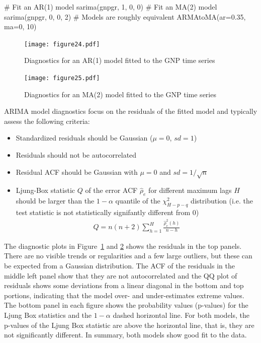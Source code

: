 \begin{samepage}
\begin{Rcode}
# Fit an AR(1) model
sarima(gnpgr, 1, 0, 0)
# Fit an MA(2) model
sarima(gnpgr, 0, 0, 2)
# Models are roughly equivalent
ARMAtoMA(ar=0.35, ma=0, 10)
\end{Rcode}
\end{samepage}

\begin{figure}
\centering
\texttt{[image: figure24.pdf]}
\caption{Diagnostics for an AR(1) model fitted to the GNP time series}
\label{fig:figure24}
\end{figure}

\begin{figure}
\centering
\texttt{[image: figure25.pdf]}
\caption{Diagnostics for an MA(2) model fitted to the GNP time series}
\label{fig:figure25}
\end{figure}

ARIMA model diagnostics focus on the residuals of the fitted model and typically assess the following criteria:

\begin{itemize}
   \item Standardized residuals should be Gaussian ($\mu=0$, $sd=1$)
   \item Residuals should not be autocorrelated
   \item Residual ACF should be Gaussian with $\mu=0$ and $sd=1/\sqrt{n}$
   \item Ljung-Box statistic $Q$ of the error ACF $\hat\rho_e$ for different maximum lags $H$ should be larger than the $1-\alpha$ quantile of the $\chi^2_{H-p-q}$ distribution (i.e. the test statistic is not statistically signifantly different from $0$)
   \begin{align*}
   Q = n(n+2) \sum_{h=1}^H \frac{\hat\rho_e^2(h)}{n-h}
   \end{align*}
\end{itemize}

The diagnostic plots in Figure~\ref{fig:figure24} and \ref{fig:figure25} shows the residuals in the top panels. There are no visible trends or regularities and a few large outliers, but these can be expected from a Gaussian distribution. The ACF of the residuals in the middle left panel show that they are not autocorrelated and the QQ plot of residuals shows some deviations from a linear diagonal in the bottom and top portions, indicating that the model over- and under-estimates extreme values. The bottom panel in each figure shows the probability values (p-values) for the Ljung Box statistics and the $1-\alpha$ dashed horizontal line. For both models, the p-values of the Ljung Box statistic are above the horizontal line, that is, they are not significantly different. In summary, both models show good fit to the data.

